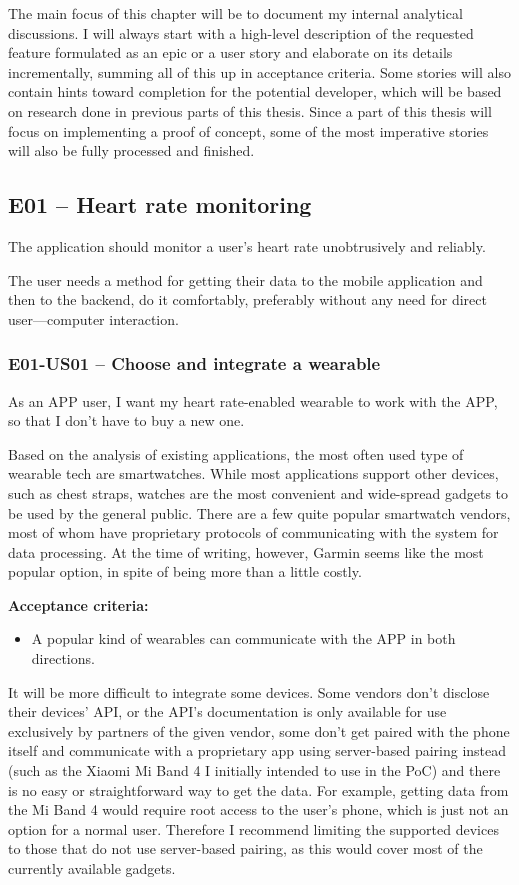 The main focus of this chapter will be to document my internal analytical discussions.
I will always start with a high-level description of the requested feature formulated as an epic or a user story and elaborate on its details incrementally, summing all of this up in acceptance criteria.
Some stories will also contain hints toward completion for the potential developer, which will be based on research done in previous parts of this thesis.
Since a part of this thesis will focus on implementing a proof of concept, some of the most imperative stories will also be fully processed and finished.

\subsection*{E01 -- Heart rate monitoring}
The application should monitor a user's heart rate unobtrusively and reliably.

The user needs a method for getting their data to the mobile application and then to the backend, do it comfortably, preferably without any need for direct user---computer interaction.

\subsubsection*{E01-US01 -- Choose and integrate a wearable}
As an APP user, I want my heart rate-enabled wearable to work with the APP, so that I don't have to buy a new one.

Based on the analysis of existing applications, the most often used type of wearable tech are smartwatches.
While most applications support other devices, such as chest straps, watches are the most convenient and wide-spread gadgets to be used by the general public.
There are a few quite popular smartwatch vendors, most of whom have proprietary protocols of communicating with the system for data processing.
At the time of writing, however, Garmin seems like the most popular option, in spite of being more than a little costly.

\textbf{Acceptance criteria:}
\begin{itemize}
    \item A popular kind of wearables can communicate with the APP in both directions.
\end{itemize}

It will be more difficult to integrate some devices.
Some vendors don't disclose their devices' API, or the API's documentation is only available for use exclusively by partners of the given vendor,
some don't get paired with the phone itself and communicate with a proprietary app using server-based pairing instead (such as the Xiaomi Mi Band 4 I initially intended to use in the PoC) and there is no easy or straightforward way to get the data.
For example, getting data from the Mi Band 4 would require root access to the user's phone\cite{miband4-server-based}, which is just not an option for a normal user.
Therefore I recommend limiting the supported devices to those that do not use server-based pairing, as this would cover most of the currently available gadgets.

